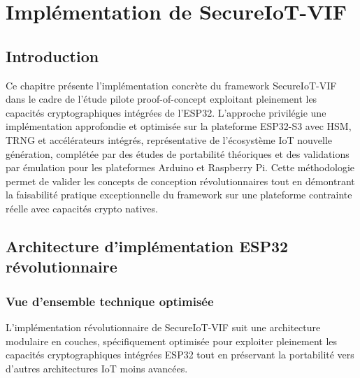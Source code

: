 
\chapter{Implémentation de SecureIoT-VIF}
\label{chap:implementation}

\section{Introduction}

Ce chapitre présente l'implémentation concrète du framework SecureIoT-VIF dans le cadre de l'étude pilote proof-of-concept exploitant pleinement les capacités cryptographiques intégrées de l'ESP32. L'approche privilégie une implémentation approfondie et optimisée sur la plateforme ESP32-S3 avec HSM, TRNG et accélérateurs intégrés, représentative de l'écosystème IoT nouvelle génération, complétée par des études de portabilité théoriques et des validations par émulation pour les plateformes Arduino et Raspberry Pi. Cette méthodologie permet de valider les concepts de conception révolutionnaires tout en démontrant la faisabilité pratique exceptionnelle du framework sur une plateforme contrainte réelle avec capacités crypto natives.

\section{Architecture d'implémentation ESP32 révolutionnaire}

\subsection{Vue d'ensemble technique optimisée}

L'implémentation révolutionnaire de SecureIoT-VIF suit une architecture modulaire en couches, spécifiquement optimisée pour exploiter pleinement les capacités cryptographiques intégrées ESP32 tout en préservant la portabilité vers d'autres architectures IoT moins avancées.

